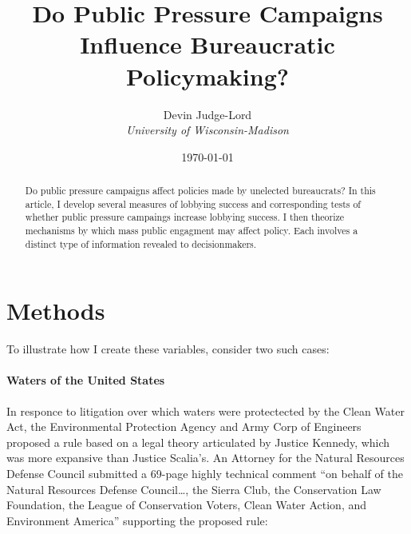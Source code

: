 \documentclass[
      12pt,
        ]{article}
\title{Do Public Pressure Campaigns Influence Bureaucratic Policymaking?}
\author{ %
            Devin Judge-Lord  \\ \emph{University of Wisconsin-Madison} 
            }
\date{\today}
\begin{document}
 


  \maketitle




  \begin{abstract}
    \noindent Do public pressure campaigns affect policies made by unelected bureaucrats? In this article, I develop several measures of lobbying success and corresponding tests of whether public pressure campaings increase lobbying success. I then theorize mechanisms by which mass public engagment may affect policy. Each involves a distinct type of information revealed to decisionmakers. 

    
  \end{abstract}










\noindent 
      \doublespacing 
    \newpage



\hypertarget{methods}{%
\section{Methods}\label{methods}}

To illustrate how I create these variables, consider two such cases:

\hypertarget{waters-of-the-united-states}{%
\paragraph{Waters of the United States}\label{waters-of-the-united-states}}

In responce to litigation over which waters were protectected by the Clean Water Act, the Environmental Protection Agency and Army Corp of Engineers proposed a rule based on a legal theory articulated by Justice Kennedy, which was more expansive than Justice Scalia's.
An Attorney for the Natural Resources Defense Council submitted a 69-page highly technical comment ``on behalf of the Natural Resources Defense Council\ldots, the Sierra Club, the Conservation Law Foundation, the League of Conservation Voters, Clean Water Action, and Environment America'' supporting the proposed rule:
\end{document}
